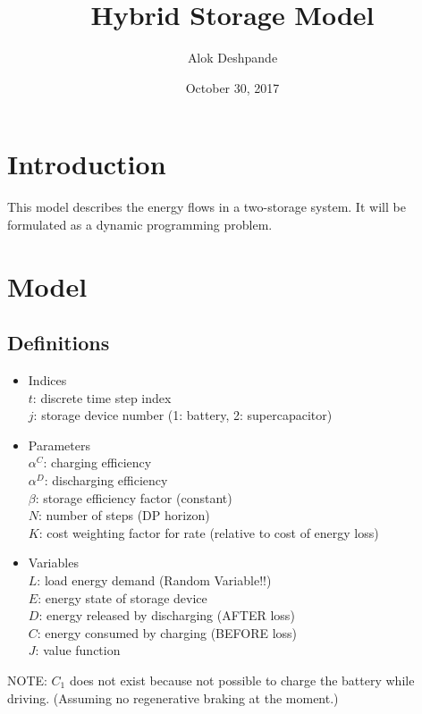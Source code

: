 \documentclass{article}
\title{Hybrid Storage Model}
\author{Alok Deshpande}
\date{October 30, 2017}
\begin{document}
	
	\maketitle
	
	\section{Introduction}
	This model describes the energy flows in a two-storage system. It will be formulated as a dynamic programming problem.
	
	\section{Model}
	
	\subsection{Definitions}
	\begin{itemize}
		\item Indices\\
		$t$: discrete time step index\\
		$j$: storage device number (1: battery, 2: supercapacitor)\\
		\item Parameters\\
		$\alpha^{C}$: charging efficiency\\
		$\alpha^{D}$: discharging efficiency\\
		$\beta$: storage efficiency factor (constant)\\
		$N$: number of steps (DP horizon)\\
		$K$: cost weighting factor for rate (relative to cost of energy loss)\\
		\item Variables\\
		$L$: load energy demand (Random Variable!!)\\
		$E$: energy state of storage device\\
		$D$: energy released by discharging (AFTER loss)\\
		$C$: energy consumed by charging (BEFORE loss)\\
		$J$: value function
	\end{itemize}
	
	NOTE: $C_{1}$ does not exist because not possible to charge the battery while driving. (Assuming no regenerative braking at the moment.)
	
\end{document}
